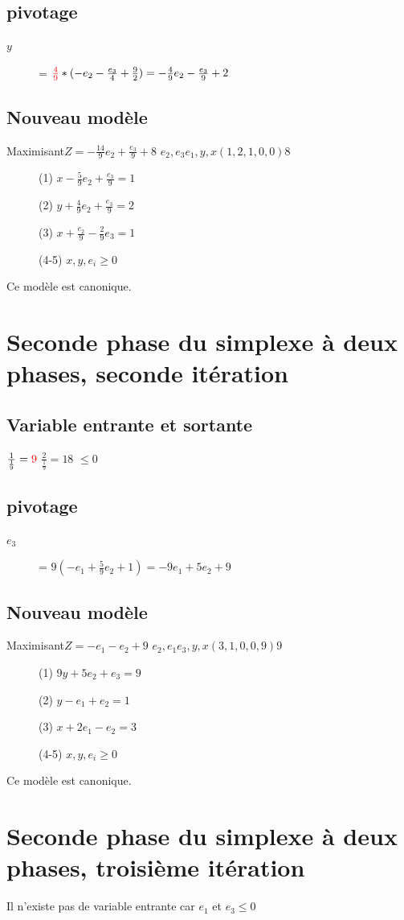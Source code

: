 \subsection{pivotage}
\begin{description}
\item[$y$] = $\textcolor{red}{\frac{4}{9}}*(- e_2 - \frac{e_3}{4} + \frac{9}{2}) = - \frac{4}{9} e_2 - \frac{e_3}{9} + 2$
\end{description}

\subsection{Nouveau modèle}
        {Maximisant}{$Z = -\frac{14}{9}e_2 + \frac{e_3}{9} + 8$}
        {$e_2,e_3$}{$e_1,y,x$}{$(1,2,1,0,0)$}{$8$}
        {\begin{description}
\item[] (1) $x - \frac{5}{9} e_2 + \frac{e_3}{9} = 1$
\item[] (2) $y + \frac{4}{9} e_2 + \frac{e_3}{9} = 2$
\item[] (3) $x + \frac{e_2}{9} - \frac{2}{9}e_3 = 1$
\item[] (4-5) $x,y,e_i \geqslant 0$
\end{description}
}
Ce modèle est canonique.

\section{Seconde phase du simplexe à deux phases, seconde itération}
\subsection{Variable entrante et sortante}
  {$\frac{1}{\frac{1}{9}} = \textcolor{red}{9}$}
  {$\frac{2}{\frac{1}{9}} = 18$}
  {$ \leqslant 0$}
  
\subsection{pivotage}
\begin{description}
\item[$e_3$] = $9(-e_1 + \frac{5}{9}e_2 + 1) = -9e_1 + 5e_2 + 9$
\end{description}

\subsection{Nouveau modèle}
        {Maximisant}{$Z = -e_1 -e_2 + 9$}
        {$e_2,e_1$}{$e_3,y,x$}{$(3,1,0,0,9)$}{$9$}
        {\begin{description}
\item[] (1) $9y + 5e_2 + e_3 = 9$
\item[] (2) $y - e_1 + e_2 = 1$
\item[] (3) $x + 2e_1 - e_2 = 3$
\item[] (4-5) $x,y,e_i \geqslant 0$
\end{description}
}
Ce modèle est canonique.

\section{Seconde phase du simplexe à deux phases, troisième itération}
Il n'existe pas de variable entrante car $e_1$ et $e_3 \leqslant 0$
\pagebreak